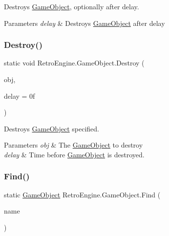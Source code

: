 Destroys \mbox{\hyperlink{class_retro_engine_1_1_game_object}{Game\+Object}}, optionally after delay. 


\begin{DoxyParams}{Parameters}
{\em delay} & Destroys \mbox{\hyperlink{class_retro_engine_1_1_game_object}{Game\+Object}} after delay\\
\hline
\end{DoxyParams}
\mbox{\label{class_retro_engine_1_1_game_object_aaa4f2fd2552c30c17dd68c0cd3d4a787}} 
\subsubsection{\texorpdfstring{Destroy()}{Destroy()}\hspace{0.1cm}{\footnotesize\ttfamily [2/2]}}
{\footnotesize\ttfamily static void Retro\+Engine.\+Game\+Object.\+Destroy (\begin{DoxyParamCaption}\item[{\mbox{\hyperlink{class_retro_engine_1_1_game_object}{Game\+Object}}}]{obj,  }\item[{float}]{delay = {\ttfamily 0f} }\end{DoxyParamCaption})\hspace{0.3cm}{\ttfamily [static]}}



Destroys \mbox{\hyperlink{class_retro_engine_1_1_game_object}{Game\+Object}} specified. 


\begin{DoxyParams}{Parameters}
{\em obj} & The \mbox{\hyperlink{class_retro_engine_1_1_game_object}{Game\+Object}} to destroy\\
\hline
{\em delay} & Time before \mbox{\hyperlink{class_retro_engine_1_1_game_object}{Game\+Object}} is destroyed.\\
\hline
\end{DoxyParams}
\mbox{\label{class_retro_engine_1_1_game_object_af51aa35d2f42bf89158f80f457376e32}} 
\subsubsection{\texorpdfstring{Find()}{Find()}}
{\footnotesize\ttfamily static \mbox{\hyperlink{class_retro_engine_1_1_game_object}{Game\+Object}} Retro\+Engine.\+Game\+Object.\+Find (\begin{DoxyParamCaption}\item[{string}]{name }\end{DoxyParamCaption})\hspace{0.3cm}{\ttfamily [static]}}



